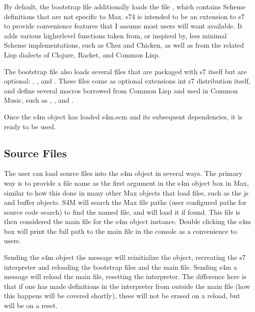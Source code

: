 \documentclass[letterpaper,10pt,english]{sphinxmanual}
\begin{document}
\sphinxAtStartPar
By default, the bootstrap file additionally loads the file , which contains Scheme definitions that are not specific to Max.
s74 is intended to be an extension to s7 to provide convenience features that I assume most users will want available.
It adds various higher\sphinxhyphen{}level functions taken from, or inspired by, less minimal Scheme implementations, such as Chez and Chicken,
as well as from the related Lisp dialects of Clojure, Racket, and Common Lisp.

\sphinxAtStartPar
The bootstrap file also loads several files that are packaged with s7 itself but are optional: , ,
and .
These files come as optional extensions int s7 distribution itself, and define several macros borrowed from Common Lisp
and used in Common Music, such as , , and .

\sphinxAtStartPar
Once the s4m object has loaded s4m.scm and its subsequent dependencies, it is ready to be used.


\subsection{Source Files}
\label{\detokenize{features_usage:source-files}}
\sphinxAtStartPar
The user can load source files into the s4m object in several ways.
The primary way is to provide a file name as the first argument in the s4m object box in Max, similar to how this done
in many other Max objects that load files, such as the js and buffer objects.
S4M will search the Max file paths (user configured paths for source code search) to find the named file, and will load it if found.
This file is then considered the main file for the s4m object instance.
Double clicking the s4m box will print the full path to the main file in the console as a convenience to users.

\sphinxAtStartPar
Sending the s4m object the  message will re\sphinxhyphen{}initialize the object, recreating the s7 interpreter and reloading
the bootstrap files and the main file.
Sending s4m a  message will reload the main file,  resetting the interpreter.
The difference here is that if one has made definitions in the interpreter from outside the main file (how this happens will
be covered shortly), these will not be erased on a reload, but will be on a reset.
\end{document}
